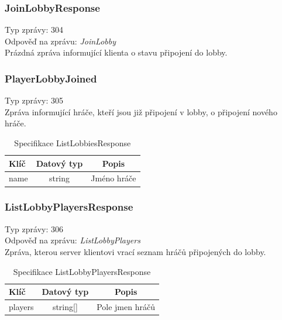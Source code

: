 \documentclass[12pt, a4paper]{article}
\begin{document}
    \subsubsection*{JoinLobbyResponse}
    Typ zprávy: 304\\
    Odpověď na zprávu: \textit{JoinLobby}\\

    Prázdná zpráva informující klienta o stavu připojení do lobby.

    \subsubsection*{PlayerLobbyJoined}
    Typ zprávy: 305\\

    Zpráva informující hráče, kteří jsou již připojení v lobby, o připojení nového hráče.

    \begin{table}[H]
        \centering
        \begin{tabular}{|l|c|c|}
            \hline
            Klíč & Datový typ & Popis\\
            \hline
            \hline
            name & string & Jméno hráče\\
            \hline
        \end{tabular}
        \caption{Specifikace ListLobbiesResponse}
    \end{table}

    \subsubsection*{ListLobbyPlayersResponse}
    Typ zprávy: 306\\
    Odpověď na zprávu: \textit{ListLobbyPlayers}\\

    Zpráva, kterou server klientovi vrací seznam hráčů připojených do lobby.

    \begin{table}[H]
        \centering
        \begin{tabular}{|l|c|c|}
            \hline
            Klíč & Datový typ & Popis\\
            \hline
            \hline
            players & string[] & Pole jmen hráčů\\
            \hline
        \end{tabular}
        \caption{Specifikace ListLobbyPlayersResponse}
    \end{table}
\end{document}
